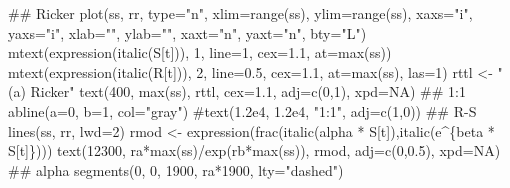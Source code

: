 \documentclass[11pt,]{article}
\newenvironment{Shaded}{}{}
\newcommand{\KeywordTok}[1]{\textcolor[rgb]{0.00,0.00,1.00}{#1}}
\newcommand{\DataTypeTok}[1]{#1}
\newcommand{\DecValTok}[1]{#1}
\newcommand{\FloatTok}[1]{#1}
\newcommand{\StringTok}[1]{\textcolor[rgb]{0.00,0.50,0.50}{#1}}
\newcommand{\CommentTok}[1]{\textcolor[rgb]{0.00,0.50,0.00}{#1}}
\newcommand{\OtherTok}[1]{\textcolor[rgb]{1.00,0.25,0.00}{#1}}
\newcommand{\OperatorTok}[1]{#1}
\newcommand{\NormalTok}[1]{#1}
\begin{document}
\begin{Shaded}
\begin{Highlighting}[]
\NormalTok{## Ricker}
\KeywordTok{plot}\NormalTok{(ss, rr, }\DataTypeTok{type=}\StringTok{"n"}\NormalTok{, }\DataTypeTok{xlim=}\KeywordTok{range}\NormalTok{(ss), }\DataTypeTok{ylim=}\KeywordTok{range}\NormalTok{(ss), }\DataTypeTok{xaxs=}\StringTok{"i"}\NormalTok{, }\DataTypeTok{yaxs=}\StringTok{"i"}\NormalTok{,}
     \DataTypeTok{xlab=}\StringTok{""}\NormalTok{, }\DataTypeTok{ylab=}\StringTok{""}\NormalTok{, }\DataTypeTok{xaxt=}\StringTok{"n"}\NormalTok{, }\DataTypeTok{yaxt=}\StringTok{"n"}\NormalTok{, }\DataTypeTok{bty=}\StringTok{"L"}\NormalTok{)}
\KeywordTok{mtext}\NormalTok{(}\KeywordTok{expression}\NormalTok{(}\KeywordTok{italic}\NormalTok{(S[t])), }\DecValTok{1}\NormalTok{, }\DataTypeTok{line=}\DecValTok{1}\NormalTok{, }\DataTypeTok{cex=}\FloatTok{1.1}\NormalTok{, }\DataTypeTok{at=}\KeywordTok{max}\NormalTok{(ss))}
\KeywordTok{mtext}\NormalTok{(}\KeywordTok{expression}\NormalTok{(}\KeywordTok{italic}\NormalTok{(R[t])), }\DecValTok{2}\NormalTok{, }\DataTypeTok{line=}\FloatTok{0.5}\NormalTok{, }\DataTypeTok{cex=}\FloatTok{1.1}\NormalTok{, }\DataTypeTok{at=}\KeywordTok{max}\NormalTok{(ss), }\DataTypeTok{las=}\DecValTok{1}\NormalTok{)}
\NormalTok{rttl <-}\StringTok{ "(a) Ricker"}
\KeywordTok{text}\NormalTok{(}\DecValTok{400}\NormalTok{, }\KeywordTok{max}\NormalTok{(ss), rttl, }\DataTypeTok{cex=}\FloatTok{1.1}\NormalTok{, }\DataTypeTok{adj=}\KeywordTok{c}\NormalTok{(}\DecValTok{0}\NormalTok{,}\DecValTok{1}\NormalTok{), }\DataTypeTok{xpd=}\OtherTok{NA}\NormalTok{)}
\NormalTok{## 1:1}
\KeywordTok{abline}\NormalTok{(}\DataTypeTok{a=}\DecValTok{0}\NormalTok{, }\DataTypeTok{b=}\DecValTok{1}\NormalTok{, }\DataTypeTok{col=}\StringTok{"gray"}\NormalTok{)}
\CommentTok{#text(1.2e4, 1.2e4, "1:1", adj=c(1,0))}
\NormalTok{## R-S}
\KeywordTok{lines}\NormalTok{(ss, rr, }\DataTypeTok{lwd=}\DecValTok{2}\NormalTok{)}
\NormalTok{rmod <-}\StringTok{ }\KeywordTok{expression}\NormalTok{(}\KeywordTok{frac}\NormalTok{(}\KeywordTok{italic}\NormalTok{(alpha }\OperatorTok{*}\StringTok{ }\NormalTok{S[t]),}\KeywordTok{italic}\NormalTok{(e}\OperatorTok{^}\NormalTok{\{beta }\OperatorTok{*}\StringTok{ }\NormalTok{S[t]\})))}
\KeywordTok{text}\NormalTok{(}\DecValTok{12300}\NormalTok{, ra}\OperatorTok{*}\KeywordTok{max}\NormalTok{(ss)}\OperatorTok{/}\KeywordTok{exp}\NormalTok{(rb}\OperatorTok{*}\KeywordTok{max}\NormalTok{(ss)), rmod, }\DataTypeTok{adj=}\KeywordTok{c}\NormalTok{(}\DecValTok{0}\NormalTok{,}\FloatTok{0.5}\NormalTok{), }\DataTypeTok{xpd=}\OtherTok{NA}\NormalTok{)}
\NormalTok{## alpha}
\KeywordTok{segments}\NormalTok{(}\DecValTok{0}\NormalTok{, }\DecValTok{0}\NormalTok{, }\DecValTok{1900}\NormalTok{, ra}\OperatorTok{*}\DecValTok{1900}\NormalTok{, }\DataTypeTok{lty=}\StringTok{"dashed"}\NormalTok{)}

\end{Highlighting}
\end{Shaded}
\end{document}
